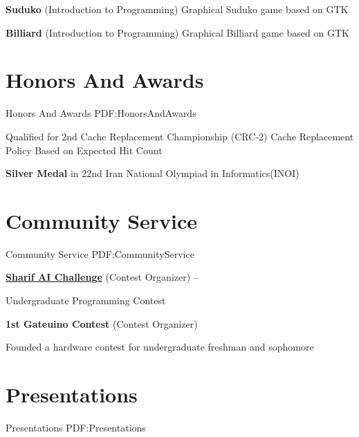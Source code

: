 \documentclass[a4paper,9pt,oneside]{article}
\begin{document}
\begin{body}
\BulletItem
\textbf{Suduko} (Introduction to Programming)
\hfill
{}
\SubBulletItem
Graphical Suduko game based on GTK

\BulletItem
\textbf{Billiard} (Introduction to Programming)
\hfill
{}
\SubBulletItem
Graphical Billiard game based on GTK




\section
{Honors\newline
And\newline
Awards}
{Honors\newline
And\newline
Awards}
{PDF:HonorsAndAwards}

\BulletItem
Qualified for 2nd Cache Replacement Championship (CRC-2)
\SubBulletItem
Cache Replacement Policy Based on Expected Hit Count
\hfill
{}


\BulletItem
\textbf{Silver Medal} in 22nd Iran National Olympiad in Informatics(INOI)
\hfill
{}




\section
{Community Service}
{Community Service}
{PDF:CommunityService}

\BulletItem
\href{https://github.com/SharifAIChallenge}{
\textbf{Sharif AI Challenge}} (Contest Organizer)
\hfill
{} --

\SubBulletItem
Undergraduate Programming Contest

\BulletItem
\textbf{1st Gateuino Contest} (Contest Organizer)
\hfill
{}

\SubBulletItem
Founded a hardware contest for undergraduate freshman and sophomore

\section
{Presentations}
{Presentations}
{PDF:Presentations}


\end{body}
\end{document}
